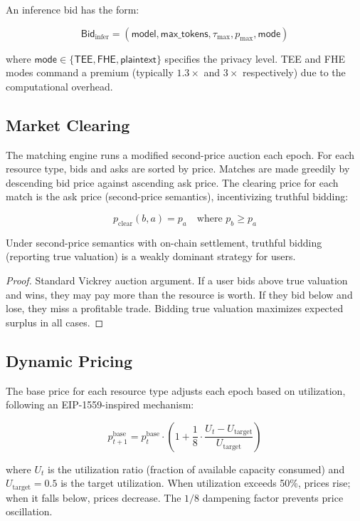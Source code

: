 An inference bid has the form:

\begin{equation}
    \mathsf{Bid}_{\text{infer}} = (\mathsf{model}, \mathsf{max\_tokens}, \tau_{\max}, p_{\max}, \mathsf{mode})
\end{equation}

where $\mathsf{mode} \in \{\mathsf{TEE}, \mathsf{FHE}, \mathsf{plaintext}\}$
specifies the privacy level. TEE and FHE modes command a premium (typically
$1.3\times$ and $3\times$ respectively) due to the computational overhead.

\subsection{Market Clearing}

The matching engine runs a modified second-price auction each epoch.
For each resource type, bids and asks are sorted by price. Matches
are made greedily by descending bid price against ascending ask price.
The clearing price for each match is the ask price (second-price
semantics), incentivizing truthful bidding:

\begin{equation}
    p_{\text{clear}}(b, a) = p_a \quad \text{where } p_b \geq p_a
\end{equation}

\begin{theorem}
Under second-price semantics with on-chain settlement, truthful bidding
(reporting true valuation) is a weakly dominant strategy for users.
\end{theorem}

\begin{proof}
Standard Vickrey auction argument. If a user bids above true valuation
and wins, they may pay more than the resource is worth. If they bid below
and lose, they miss a profitable trade. Bidding true valuation maximizes
expected surplus in all cases.
\end{proof}

\subsection{Dynamic Pricing}

The base price for each resource type adjusts each epoch based on
utilization, following an EIP-1559-inspired mechanism:

\begin{equation}\label{eq:pricing}
    p_{t+1}^{\text{base}} = p_t^{\text{base}} \cdot \left(1 + \frac{1}{8} \cdot \frac{U_t - U_{\text{target}}}{U_{\text{target}}}\right)
\end{equation}

where $U_t$ is the utilization ratio (fraction of available capacity
consumed) and $U_{\text{target}} = 0.5$ is the target utilization.
When utilization exceeds 50\%, prices rise; when it falls below, prices
decrease. The $1/8$ dampening factor prevents price oscillation.

